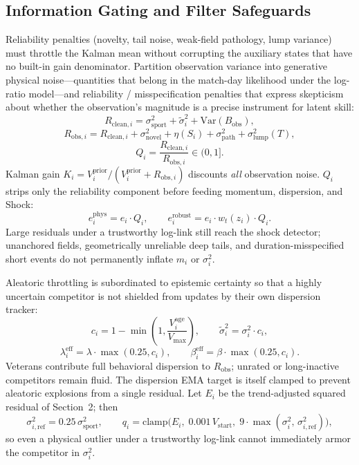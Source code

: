 \documentclass[12pt]{article}
\newcommand{\sigmai}{\sigma_i^2}
\newcommand{\ssport}{\sigma_{\mathrm{sport}}^2}      %
\newcommand{\vstart}{V_{\mathrm{start}}}
\newcommand{\vmax}{V_{\mathrm{max}}}
\newcommand{\slump}{\sigma_{\mathrm{lump}}^2}  %
\newcommand{\betad}{\beta}      %
\newcommand{\lambdad}{\lambda}  %
\newcommand{\bobs}{B_{\mathrm{obs}}}
\newcommand{\ephys}{e_i^{\mathrm{phys}}}
\newcommand{\erobust}{e_i^{\mathrm{robust}}}
\begin{document}
	\subsection{Information Gating and Filter Safeguards}
	\label{sec:gating}
	Reliability penalties (novelty, tail noise, weak-field pathology, lump variance) must throttle the Kalman mean without corrupting the auxiliary states that have no built-in gain denominator. Partition observation variance into generative physical noise---quantities that belong in the match-day likelihood under the log-ratio model---and reliability / misspecification penalties that express skepticism about whether the observation's magnitude is a precise instrument for latent skill:
	\begin{equation}
		R_{\mathrm{clean},i} = \ssport + \tilde{\sigma}_i^2 + \mathrm{Var}(\bobs),
	\end{equation}
	\begin{equation}
		R_{\mathrm{obs},i} = R_{\mathrm{clean},i} + \sigma_{\mathrm{novel}}^2 + \eta(S_i) + \sigma_{\mathrm{path}}^2 + \slump(T),
	\end{equation}
	\begin{equation}
		Q_i = \frac{R_{\mathrm{clean},i}}{R_{\mathrm{obs},i}} \in (0,1].
	\end{equation}
	Kalman gain $K_i = V_i^{\mathrm{prior}} / (V_i^{\mathrm{prior}} + R_{\mathrm{obs},i})$ discounts \emph{all} observation noise. $Q_i$ strips only the reliability component before feeding momentum, dispersion, and Shock:
	\begin{equation}
		\ephys = e_i \cdot Q_i, \qquad \erobust = e_i \cdot w_t(z_i) \cdot Q_i.
	\end{equation}
	Large residuals under a trustworthy log-link still reach the shock detector; unanchored fields, geometrically unreliable deep tails, and duration-misspecified short events do not permanently inflate $m_i$ or $\sigmai$.
	
	Aleatoric throttling is subordinated to epistemic certainty so that a highly uncertain competitor is not shielded from updates by their own dispersion tracker:
	\begin{equation}
		c_i = 1 - \min\!\left(1,\frac{V_i^{\mathrm{age}}}{\vmax}\right), \qquad
		\tilde{\sigma}_i^2 = \sigmai \cdot c_i,
	\end{equation}
	\begin{equation}
		\lambdad_i^{\mathrm{eff}} = \lambdad \cdot \max(0.25, c_i), \qquad
		\betad_i^{\mathrm{eff}} = \betad \cdot \max(0.25, c_i).
	\end{equation}
	Veterans contribute full behavioral dispersion to $R_{\mathrm{obs}}$; unrated or long-inactive competitors remain fluid. The dispersion EMA target is itself clamped to prevent aleatoric explosions from a single residual. Let $E_i$ be the trend-adjusted squared residual of Section~2; then
	\begin{equation}
		\sigma_{i,\mathrm{ref}}^2 = 0.25\,\ssport, \qquad
		q_i = \mathrm{clamp}\!\bigl(E_i,\; 0.001\,\vstart,\; 9\cdot\max(\sigmai,\, \sigma_{i,\mathrm{ref}}^2)\bigr),
	\end{equation}
	so even a physical outlier under a trustworthy log-link cannot immediately armor the competitor in $\sigmai$.
	
\end{document}
